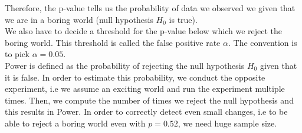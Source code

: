 Therefore, the p-value tells us the probability of data we observed we given that we are in a boring world (null hypothesis $H_0$ is true). \\
We also have to decide a threshold for the p-value below which we reject the boring world. This threshold is called the false positive rate $\alpha$. The convention is to pick $\alpha = 0.05$.\\
Power is defined as the probability of rejecting the null hypothesis $H_0$ given that it is false. In order to estimate this probability, we conduct the opposite experiment, i.e we assume an exciting world and run the experiment multiple times. Then, we compute the number of times we reject the null hypothesis and this results in Power. In order to correctly detect even small changes, i.e to be able to reject a boring world even with $p = 0.52$, we need huge sample size.